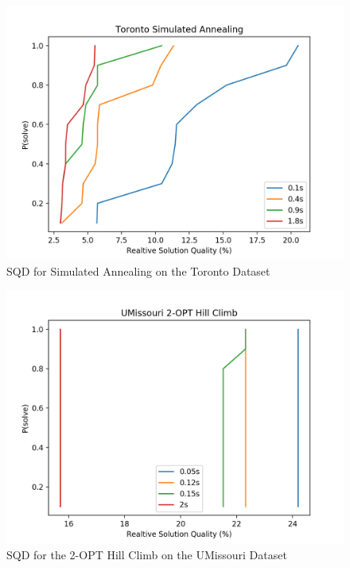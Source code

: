 \documentclass[format=sigconf]{acmart}
\begin{document}
\begin{figure}[htbp]
    \centerline{\includegraphics[scale=.5]{graphs/Toronto_LS2_SQD.png}}
    \caption{SQD for Simulated Annealing on the Toronto Dataset}
    \label{fig6}
\end{figure}

\begin{figure}[htbp]
    \centerline{\includegraphics[scale=.5]{graphs/UMissouri_LS1_SQD.png}}
    \caption{SQD for the 2-OPT Hill Climb on the UMissouri Dataset}
    \label{fig7}
\end{figure}
\end{document}
